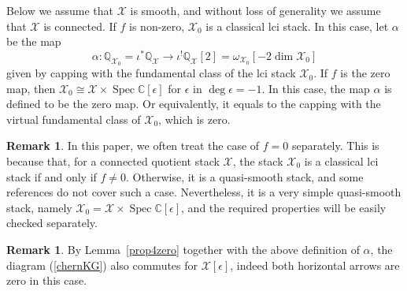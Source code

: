 \documentclass [11pt,oneside,a4paper,mathscr]{amsart}
\theoremstyle{definition}
\newtheorem{remark}[thm]{Remark}
\newcommand{\X}{\mathscr{X}}
\newcommand{\Spec}{\operatorname{Spec}}
\begin{document}
Below we assume that $\X$ is smooth, and without loss of generality we assume that $\X$ is connected. If $f$ is non-zero, 
$\X_0$ is a classical lci stack. In this case, 
let $\alpha$ be the map \[\alpha\colon \mathbb{Q}_{\X_0}=\iota^*\mathbb{Q}_{\X}\to \iota^!\mathbb{Q}_{\X}[2]=\omega_{\X_0}[-2\dim \X_0]\] given by capping with the fundamental class of the lci stack $\X_0$. 
If $f$ is the zero map, 
then $\X_0\cong \X\times \Spec \mathbb{C}[\epsilon]$ 
for $\epsilon$ in $\deg \epsilon=-1$. In this case, 
the map $\alpha$ is defined to be the zero map. 
Or equivalently, it equals to the capping with the virtual fundamental 
class of $\X_0$, which is zero. 

\begin{remark}\label{rmk:zero}
In this paper, we often treat the case of $f=0$ separately. This is because
that, for a connected quotient stack $\X$, the stack $\X_0$ is a classical lci stack if and only if $f\neq 0$. Otherwise, it is a quasi-smooth stack, 
and some references do not cover such a case. Nevertheless, it is 
a very simple quasi-smooth stack, namely $\X_0=\X\times \Spec \mathbb{C}[\epsilon]$, and the required properties will be easily checked separately. 
\end{remark}

\begin{remark}\label{rmk:comzero}
By Lemma~\ref{prop4zero} together with the above definition of $\alpha$, the diagram (\ref{chernKG}) also commutes for $\X[\epsilon]$, indeed both horizontal arrows are zero in this case.
\end{remark}
\end{document}
